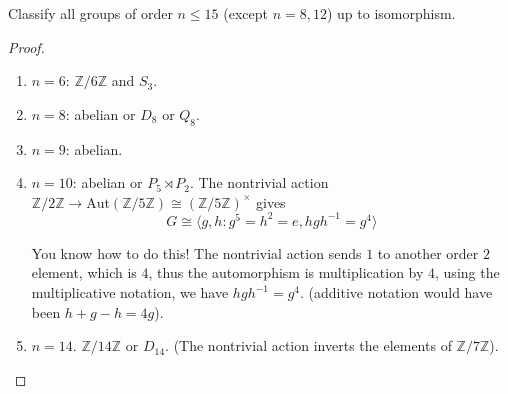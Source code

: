 \documentclass[openany]{book}
\newcommand{\Z}{\mathbb{Z}}
\newcommand{\la}{\langle}
\newcommand{\ra}{\rangle}
\begin{document}
\begin{prob}[2.15]
Classify all groups of order \( n \leq 15 \) (except \( n = 8, 12 \)) up to isomorphism.
\end{prob}
\begin{proof}
    \begin{enumerate}
        \item $n=6$: $\Z/6\Z$ and $S_3$.
        \item $n=8$: abelian or $D_8$ or $Q_8$.
        \item $n=9$: abelian.
        \item $n=10$: abelian or $P_5\rtimes P_2$. The nontrivial action $\Z/2\Z\to\text{Aut}(\Z/5\Z)\cong(\Z/5\Z)^\times$ gives 
        \begin{equation*}
            G\cong \la g,h: g^5=h^2=e, hgh^{-1}=g^4\ra
        \end{equation*}
        \begin{warn}
            You know how to do this! The nontrivial action sends $1$ to another order $2$ element, which is $4$, thus the automorphism is multiplication by $4$, using the multiplicative notation, we have $hgh^{-1}=g^4$. (additive notation would have been $h+g-h=4g$).
        \end{warn}
        \item $n=14$. $\Z/14\Z$ or $D_{14}$. (The nontrivial action inverts the elements of $\Z/7\Z$).
    \end{enumerate}
\end{proof}



    
\end{document}
